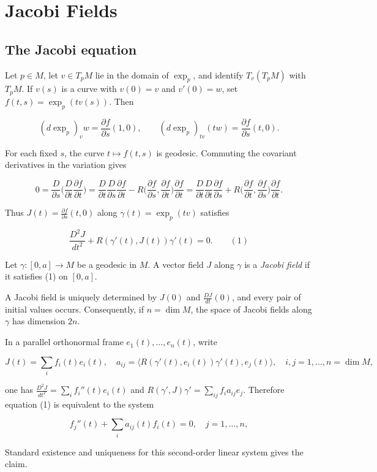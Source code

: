 \chapter{Jacobi Fields}
\label{chap:dc-jacobi-fields}

\section{The Jacobi equation}

Let $p\in M$, let $v\in T_pM$ lie in the domain of $\exp_p$, and identify
$T_v(T_pM)$ with $T_pM$. If $v(s)$ is a curve with $v(0)=v$ and $v'(0)=w$, set
$f(t,s)=\exp_p(tv(s))$. Then

$$
(d\exp_p)_v w=\frac{\partial f}{\partial s}(1,0),\qquad
(d\exp_p)_{tv}(tw)=\frac{\partial f}{\partial s}(t,0).
$$

\sketch
For each fixed $s$, the curve $t\mapsto f(t,s)$ is geodesic. Commuting the
covariant derivatives in the variation gives

$$
0=\frac{D}{\partial s}\Big(\frac{D}{\partial t}\frac{\partial f}{\partial t}\Big)
=\frac{D}{\partial t}\frac{D}{\partial s}\frac{\partial f}{\partial t}
-R\Big(\frac{\partial f}{\partial s},\frac{\partial f}{\partial t}\Big)\frac{\partial f}{\partial t}
=\frac{D}{\partial t}\frac{D}{\partial t}\frac{\partial f}{\partial s}
+R\Big(\frac{\partial f}{\partial t},\frac{\partial f}{\partial s}\Big)\frac{\partial f}{\partial t}.
$$

Thus $J(t)=\frac{\partial f}{\partial s}(t,0)$ along
$\gamma(t)=\exp_p(tv)$ satisfies

$$
\frac{D^2 J}{dt^2}+R(\gamma'(t),J(t))\gamma'(t)=0.\qquad(1)
$$

\begin{definition}
  \label{def:dc-ch5-2-1}
  \leanok
  Let $\gamma:[0,a]\to M$ be a geodesic in $M$. A vector field $J$ along $\gamma$ is
  a \emph{Jacobi field} if it satisfies (1) on $[0,a]$.

  A Jacobi field is uniquely determined by $J(0)$ and $\frac{DJ}{dt}(0)$, and
  every pair of initial values occurs. Consequently, if $n=\dim M$, the space
  of Jacobi fields along $\gamma$ has dimension $2n$.

  \sketch
  In a parallel orthonormal frame $e_1(t),\dots,e_n(t)$, write
  
  $$
  J(t)=\sum_i f_i(t)e_i(t),\quad a_{ij}=\langle R(\gamma'(t),e_i(t))\gamma'(t),e_j(t)\rangle,\quad i,j=1,\dots,n=\dim M,
  $$
  
  one has $\frac{D^2 J}{dt^2}=\sum_i f_i''(t)e_i(t)$ and
  $R(\gamma',J)\gamma'=\sum_{ij}f_i a_{ij}e_j$. Therefore equation (1) is equivalent
  to the system
  
  $$
  f_j''(t)+\sum_i a_{ij}(t)f_i(t)=0,\quad j=1,\dots,n,
  $$
  
  Standard existence and uniqueness for this second-order linear system gives
  the claim.
\end{definition}

